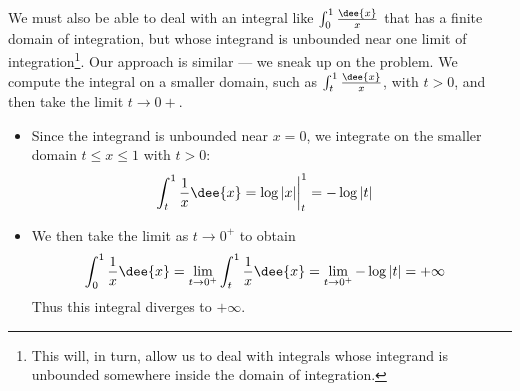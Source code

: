 We must also be able to deal with an integral like $\int_0^1\frac{\dee{x}}{x}$
that has a finite domain of integration, but whose integrand is unbounded
near one limit of integration\footnote{This will, in turn, allow us to
deal with integrals whose integrand is unbounded somewhere inside the domain of
integration.}. Our approach is similar --- we sneak up on the problem.
We compute the integral on a smaller domain, such as $\int_t^1\frac{\dee{x}}{x}$, with
$t>0$, and then take the limit $t\rightarrow 0+$.
\begin{eg}
\soln
\begin{itemize}
 \item Since the integrand is unbounded near $x=0$, we integrate on the smaller domain
$t\leq x \leq 1$ with $t>0$:
\begin{align*}
  \int_t^1 \frac{1}{x}\dee{x}
  &= \log|x| \bigg|_t^1 = -\log|t|
\end{align*}
\item We then take the limit as $t \to 0^+$ to obtain
\begin{align*}
  \int_0^1 \frac{1}{x}\dee{x}
&= \lim_{t\to 0^+}\int_t^1 \frac{1}{x}\dee{x} = \lim_{t\to 0^+} -\log|t|
= +\infty
\end{align*}
Thus this integral diverges to $+\infty$.
\end{itemize}
\end{eg}
%



